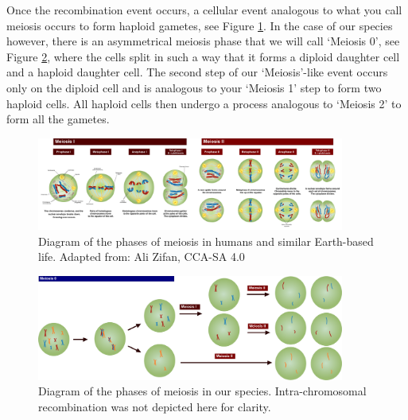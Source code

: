 Once the recombination event occurs, a cellular event analogous to what you call meiosis occurs to form haploid gametes, see Figure \ref{fig:meiosis_human}. In the case of our species however, there is an asymmetrical meiosis phase that we will call `Meiosis 0', see Figure \ref{fig:meiosis_us}, where the cells split in such a way that it forms a diploid daughter cell and a haploid daughter cell. The second step of our `Meiosis'-like event occurs only on the diploid cell and is analogous to your `Meiosis 1' step to form two haploid cells. All haploid cells then undergo a process analogous to `Meiosis 2' to form all the gametes.


\begin{figure}
    \centering
    \includegraphics[width = 0.9\textwidth]{AshleyFig/meiosis3.png}
    \caption{Diagram of the phases of meiosis in humans and similar Earth-based life. Adapted from: Ali Zifan, CCA-SA 4.0}
    \label{fig:meiosis_human}
\end{figure}

\begin{figure}
    \centering
    \includegraphics[width = 0.9\textwidth]{AshleyFig/meiosis0.png}
    \caption{Diagram of the phases of meiosis in our species. Intra-chromosomal recombination was not depicted here for clarity.}
    \label{fig:meiosis_us}
\end{figure}


